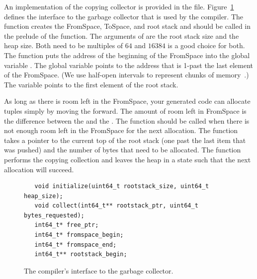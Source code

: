 \documentclass[7x10]{TimesAPriori_MIT}%
\begin{document}
An implementation of the copying collector is provided in the
 file. Figure~\ref{fig:gc-header} defines the
interface to the garbage collector that is used by the compiler. The
 function creates the FromSpace, ToSpace, and root
stack and should be called in the prelude of the 
function. The arguments of  are the root stack size
and the heap size. Both need to be multiples of $64$ and $16384$ is a
good choice for both.  The  function puts the address
of the beginning of the FromSpace into the global variable
. The global variable  points to
the address that is 1-past the last element of the FromSpace. (We use
half-open intervals to represent chunks of
memory~\citep{Dijkstra:1982aa}.)  The  variable
points to the first element of the root stack.

As long as there is room left in the FromSpace, your generated code
can allocate tuples simply by moving the  forward.
%
The amount of room left in FromSpace is the difference between the
 and the .  The 
function should be called when there is not enough room left in the
FromSpace for the next allocation.  The  function takes
a pointer to the current top of the root stack (one past the last item
that was pushed) and the number of bytes that need to be
allocated. The  function performs the copying collection
and leaves the heap in a state such that the next allocation will
succeed.

\begin{figure}[tbp]
\begin{lstlisting}
   void initialize(uint64_t rootstack_size, uint64_t heap_size);
   void collect(int64_t** rootstack_ptr, uint64_t bytes_requested);
   int64_t* free_ptr;
   int64_t* fromspace_begin;
   int64_t* fromspace_end;
   int64_t** rootstack_begin;
\end{lstlisting}
\caption{The compiler's interface to the garbage collector.}
\label{fig:gc-header}
\end{figure}
\end{document}
